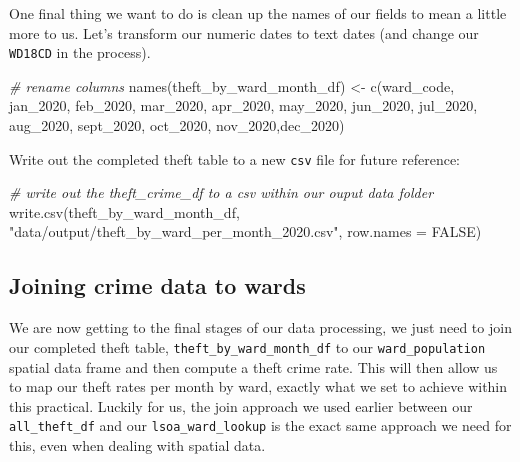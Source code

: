 \documentclass[
]{book}
\newenvironment{Shaded}{\begin{snugshade}}{\end{snugshade}}
\newcommand{\AttributeTok}[1]{\textcolor[rgb]{0.77,0.63,0.00}{#1}}
\newcommand{\CommentTok}[1]{\textcolor[rgb]{0.56,0.35,0.01}{\textit{#1}}}
\newcommand{\ConstantTok}[1]{\textcolor[rgb]{0.00,0.00,0.00}{#1}}
\newcommand{\FunctionTok}[1]{\textcolor[rgb]{0.00,0.00,0.00}{#1}}
\newcommand{\NormalTok}[1]{#1}
\newcommand{\OtherTok}[1]{\textcolor[rgb]{0.56,0.35,0.01}{#1}}
\newcommand{\StringTok}[1]{\textcolor[rgb]{0.31,0.60,0.02}{#1}}
\begin{document}
One final thing we want to do is clean up the names of our fields to mean a little more to us. Let's transform our numeric dates to text dates (and change our \texttt{WD18CD} in the process).

\begin{Shaded}
\begin{Highlighting}[]
\CommentTok{\# rename columns}
\FunctionTok{names}\NormalTok{(theft\_by\_ward\_month\_df) }\OtherTok{\textless{}{-}} \FunctionTok{c}\NormalTok{(}\StringTok{\textquotesingle{}ward\_code\textquotesingle{}}\NormalTok{, }\StringTok{\textquotesingle{}jan\_2020\textquotesingle{}}\NormalTok{, }\StringTok{\textquotesingle{}feb\_2020\textquotesingle{}}\NormalTok{, }\StringTok{\textquotesingle{}mar\_2020\textquotesingle{}}\NormalTok{, }\StringTok{\textquotesingle{}apr\_2020\textquotesingle{}}\NormalTok{, }\StringTok{\textquotesingle{}may\_2020\textquotesingle{}}\NormalTok{, }\StringTok{\textquotesingle{}jun\_2020\textquotesingle{}}\NormalTok{, }\StringTok{\textquotesingle{}jul\_2020\textquotesingle{}}\NormalTok{, }\StringTok{\textquotesingle{}aug\_2020\textquotesingle{}}\NormalTok{, }\StringTok{\textquotesingle{}sept\_2020\textquotesingle{}}\NormalTok{, }\StringTok{\textquotesingle{}oct\_2020\textquotesingle{}}\NormalTok{, }\StringTok{\textquotesingle{}nov\_2020\textquotesingle{}}\NormalTok{,}\StringTok{\textquotesingle{}dec\_2020\textquotesingle{}}\NormalTok{)}
\end{Highlighting}
\end{Shaded}

Write out the completed theft table to a new \texttt{csv} file for future reference:

\begin{Shaded}
\begin{Highlighting}[]
\CommentTok{\# write out the theft\_crime\_df to a csv within our ouput data folder}
\FunctionTok{write.csv}\NormalTok{(theft\_by\_ward\_month\_df, }\StringTok{"data/output/theft\_by\_ward\_per\_month\_2020.csv"}\NormalTok{, }\AttributeTok{row.names =} \ConstantTok{FALSE}\NormalTok{)}
\end{Highlighting}
\end{Shaded}

\hypertarget{joining-crime-data-to-wards}{%
\subsection{Joining crime data to wards}\label{joining-crime-data-to-wards}}

We are now getting to the final stages of our data processing, we just need to join our completed theft table, \texttt{theft\_by\_ward\_month\_df} to our \texttt{ward\_population} spatial data frame and then compute a theft crime rate. This will then allow us to map our theft rates per month by ward, exactly what we set to achieve within this practical. Luckily for us, the join approach we used earlier between our \texttt{all\_theft\_df} and our \texttt{lsoa\_ward\_lookup} is the exact same approach we need for this, even when dealing with spatial data.
\end{document}
